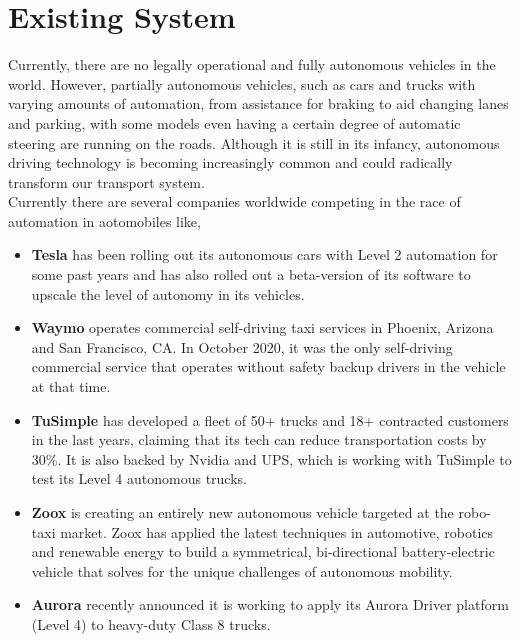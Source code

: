 \section{Existing System}
Currently, there are no legally operational and fully autonomous vehicles in the world. However, partially autonomous vehicles, such as cars and trucks with varying amounts of automation, from assistance for braking to aid changing lanes and parking, with some models even having a certain degree of automatic steering are running on the roads. Although it is still in its infancy, autonomous driving technology is becoming increasingly common and could radically transform our transport system.
\\
Currently there are several companies worldwide competing in the race of automation in aotomobiles like, \cite{fujimoto2019benchmarking}\cite{yang2017midinet}\cite{8478136}\cite{8540720}
\begin{itemize}
    \item \textbf{Tesla} has been rolling out its autonomous cars with Level 2 automation for some past years and has also rolled out a beta-version of its software to upscale the level of autonomy in its vehicles.
    \item \textbf{Waymo} operates commercial self-driving taxi services in Phoenix, Arizona and San Francisco, CA. In October 2020, it was the only self-driving commercial service that operates without safety backup drivers in the vehicle at that time.
    \item \textbf{TuSimple} has developed a fleet of 50+ trucks and 18+ contracted customers in the last years, claiming that its tech can reduce transportation costs by 30\%. It is also backed by Nvidia and UPS, which is working with TuSimple to test its Level 4 autonomous trucks.
    \item \textbf{Zoox} is creating an entirely new autonomous vehicle targeted at the robo-taxi market. Zoox has applied the latest techniques in automotive, robotics and renewable energy to build a symmetrical, bi-directional battery-electric vehicle that solves for the unique challenges of autonomous mobility.
    \item \textbf{Aurora} recently announced it is working to apply its Aurora Driver platform (Level 4) to heavy-duty Class 8 trucks. 
\end{itemize}





